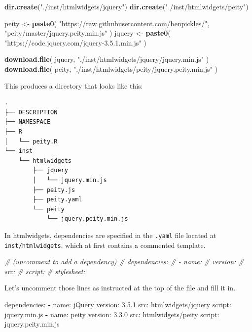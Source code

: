 \documentclass[10pt,]{krantz}
\makeatletter
\newenvironment{Shaded}{\begin{snugshade}}{\end{snugshade}}
\newcommand{\AttributeTok}[1]{\textcolor[rgb]{0.61,0.61,0.61}{#1}}
\newcommand{\CommentTok}[1]{\textcolor[rgb]{0.37,0.37,0.37}{\textit{#1}}}
\newcommand{\FloatTok}[1]{\textcolor[rgb]{0.06,0.06,0.06}{#1}}
\newcommand{\FunctionTok}[1]{\textcolor[rgb]{0,0,0}{#1}}
\newcommand{\KeywordTok}[1]{\textcolor[rgb]{0.27,0.27,0.27}{\textbf{#1}}}
\newcommand{\NormalTok}[1]{#1}
\newcommand{\StringTok}[1]{\textcolor[rgb]{0.5,0.5,0.5}{#1}}
\newenvironment{kframe}{%
\medskip{}
\setlength{\fboxsep}{.8em}
 \def\at@end@of@kframe{}%
 \ifinner\ifhmode%
  \def\at@end@of@kframe{\end{minipage}}%
  \begin{minipage}{\columnwidth}%
 \fi\fi%
 \def\FrameCommand##1{\hskip\@totalleftmargin \hskip-\fboxsep
 \colorbox{shadecolor}{##1}\hskip-\fboxsep
     \hskip-\linewidth \hskip-\@totalleftmargin \hskip\columnwidth}%
 \MakeFramed {\advance\hsize-\width
   \@totalleftmargin\z@ \linewidth\hsize
   \@setminipage}}%
 {\par\unskip\endMakeFramed%
 \at@end@of@kframe}
\renewenvironment{Shaded}{\begin{kframe}}{\end{kframe}}
\makeatother
\begin{document}
\begin{Shaded}
\begin{Highlighting}[]
\KeywordTok{dir.create}\NormalTok{(}\StringTok{"./inst/htmlwidgets/jquery"}\NormalTok{)}
\KeywordTok{dir.create}\NormalTok{(}\StringTok{"./inst/htmlwidgets/peity"}\NormalTok{)}

\NormalTok{peity <-}\StringTok{ }\KeywordTok{paste0}\NormalTok{(}
  \StringTok{"https://raw.githubusercontent.com/benpickles/"}\NormalTok{,}
  \StringTok{"peity/master/jquery.peity.min.js"}
\NormalTok{)}
\NormalTok{jquery <-}\StringTok{ }\KeywordTok{paste0}\NormalTok{(}
  \StringTok{"https://code.jquery.com/jquery-3.5.1.min.js"}
\NormalTok{)}

\KeywordTok{download.file}\NormalTok{(}
\NormalTok{  jquery, }\StringTok{"./inst/htmlwidgets/jquery/jquery.min.js"}
\NormalTok{)}
\KeywordTok{download.file}\NormalTok{(}
\NormalTok{  peity, }\StringTok{"./inst/htmlwidgets/peity/jquery.peity.min.js"}
\NormalTok{)}
\end{Highlighting}
\end{Shaded}

This produces a directory that looks like this:

\begin{verbatim}
.
├── DESCRIPTION
├── NAMESPACE
├── R
│   └── peity.R
└── inst
    └── htmlwidgets
        ├── jquery
        │   └── jquery.min.js
        ├── peity.js
        ├── peity.yaml
        └── peity
            └── jquery.peity.min.js
\end{verbatim}

In htmlwidgets, dependencies are specified in the \texttt{.yaml} file located at \texttt{inst/htmlwidgets}, which at first contains a commented template.

\begin{Shaded}
\begin{Highlighting}[]
\CommentTok{# (uncomment to add a dependency)}
\CommentTok{# dependencies:}
\CommentTok{#  - name:}
\CommentTok{#    version:}
\CommentTok{#    src:}
\CommentTok{#    script:}
\CommentTok{#    stylesheet:}
\end{Highlighting}
\end{Shaded}

Let's uncomment those lines as instructed at the top of the file and fill it in.

\begin{Shaded}
\begin{Highlighting}[]
\FunctionTok{dependencies:}
  \KeywordTok{-} \FunctionTok{name:}\AttributeTok{ jQuery}
    \FunctionTok{version:}\AttributeTok{ }\FloatTok{3.5.1}
    \FunctionTok{src:}\AttributeTok{ htmlwidgets/jquery}
    \FunctionTok{script:}\AttributeTok{ jquery.min.js}
  \KeywordTok{-} \FunctionTok{name:}\AttributeTok{ peity}
    \FunctionTok{version:}\AttributeTok{ }\FloatTok{3.3.0}
    \FunctionTok{src:}\AttributeTok{ htmlwidgets/peity}
    \FunctionTok{script:}\AttributeTok{ jquery.peity.min.js}
\end{Highlighting}
\end{Shaded}
\end{document}
